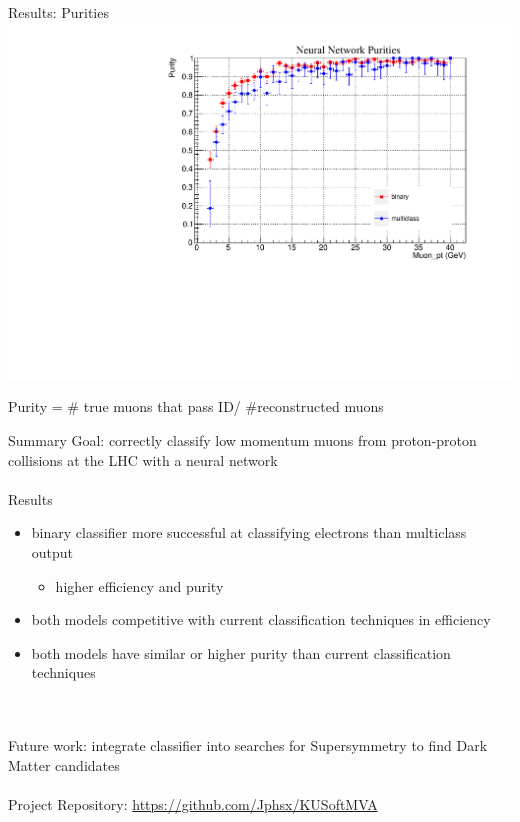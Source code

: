 \documentclass[10pt,handout]{beamer}
\begin{document}
\begin{frame}{Results: Purities}
\centering
\includegraphics[scale=.5]{NN_purities.pdf}

Purity = \# true muons that pass ID/ \#reconstructed muons
\end{frame}


\begin{frame}{Summary}
Goal: correctly classify low momentum muons from proton-proton collisions at the LHC with a neural network
\quad \\
\quad \\
Results
\begin{itemize}
\item binary classifier more successful at classifying electrons than multiclass output
\begin{itemize}
\item higher efficiency and purity
\end{itemize}
\item both models competitive with current classification techniques in efficiency
\item both models have similar or higher purity than current classification techniques
\end{itemize}
\quad \\
\quad \\
Future work: integrate classifier into searches for Supersymmetry to find Dark Matter candidates
\quad \\
\quad \\
Project Repository: \url{https://github.com/Jphsx/KUSoftMVA}
\end{frame}
\end{document}
